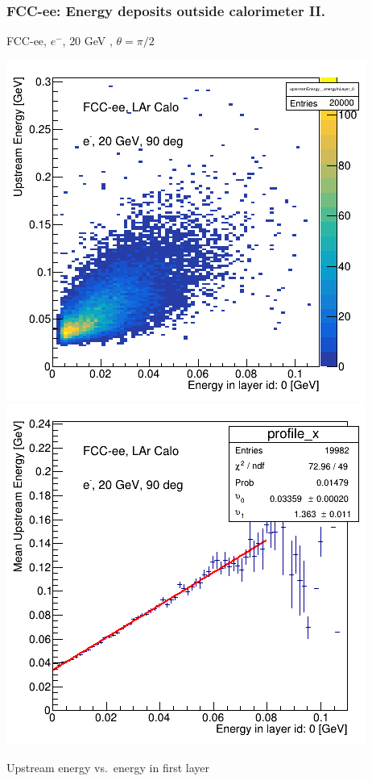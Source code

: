 \documentclass{beamer}
\newcommand{\redtext}[1]{%
  \textcolor{myRed}{#1}
}
\begin{document}
\begin{frame}
  \frametitle{FCC-ee: Energy deposits outside calorimeter II.}

  \centering
  FCC-ee, $e^{-}$, \redtext{20 GeV}, $\theta = \pi/2$ \\[1.5ex]
  \begin{adjustwidth}{-9mm}{-9mm}
    \includegraphics[width=0.49\linewidth]{figures/12layers/hist_upstream_vs_layer_0_90deg_20GeV.png}
    \includegraphics[width=0.49\linewidth]{figures/12layers/profile_upstream_vs_layer_0_90deg_20GeV.png}
  \end{adjustwidth}
  \redtext{Upstream} energy vs.\ energy in first layer
\end{frame}
\end{document}
